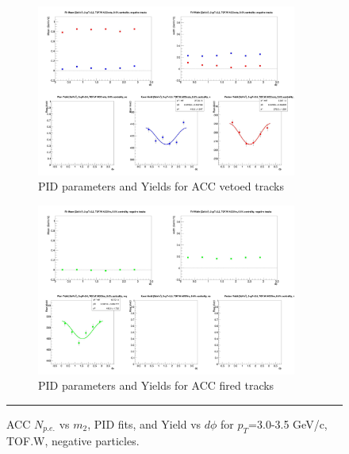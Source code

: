 \begin{figure}[H]
  \ContinuedFloat
    \vspace*{-1cm}
    \begin{subfigure}{1\textwidth}
   \centering
   \includegraphics[width=0.94\textwidth]{hiptfits/neg/fitParams_tof2_cent0_ch0_pT-30-35.jpg}
    \caption{PID parameters and Yields for ACC vetoed tracks}
    \end{subfigure}    
    \begin{subfigure}{1\textwidth}
   \centering
   \includegraphics[width=0.94\textwidth]{hiptfits/neg/fitParams_tof3_cent0_ch0_pT-30-35.jpg}
    \caption{PID parameters and Yields for ACC fired tracks}
    \end{subfigure} 
    \rule{35em}{0.5pt}
  \caption[ACC $N_{p.e.}$ vs $m_2$, PID fits, and Yield vs $d\phi$ for $p_T$=3.0-3.5 GeV/c, TOF.W, negative particles.]{ACC $N_{p.e.}$ vs $m_2$, PID fits, and Yield vs $d\phi$ for $p_T$=3.0-3.5 GeV/c, TOF.W, negative particles.}
  \label{fig:acc30-35neg}
\end{figure}

